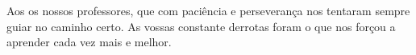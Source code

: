 \agradecimentos
Aos os nossos professores, que com paciência e perseverança nos tentaram sempre guiar no caminho certo. As vossas constante derrotas foram o que nos forçou a aprender cada vez mais e melhor.\\